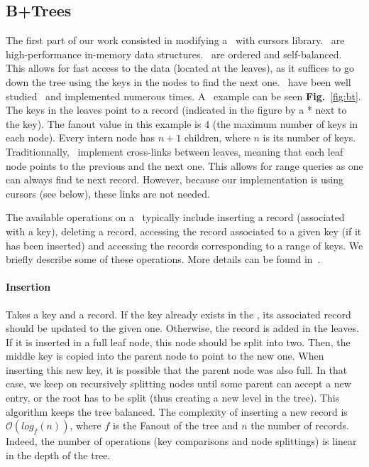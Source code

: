 
\subsection{B+Trees}
The first part of our work consisted in modifying a \btrees\ with cursors library.
\btrees\ are high-performance in-memory data structures. \btrees\ are ordered and self-balanced.
This allows for fast access to the data (located at the leaves), as it suffices to go down the tree using the keys in the nodes to find the next one.
\btrees\ have been well studied~\cite{dbms} and implemented numerous times. %
A \btree\ example can be seen \textbf{Fig.}~\ref{fig:bt}.
The keys in the leaves point to a record (indicated in the figure by a * next to the key).
The fanout value in this example is 4 (the maximum number of keys in each node).
Every intern node has $n+1$ children, where $n$ is its number of keys.
Traditionnally, \btrees\ implement cross-links between leaves, meaning that each leaf node points to the previous and the next one.
This allows for range queries as one can always find te next record.
However, because our implementation is using cursors (see below), these links are not needed.

The available operations on a \btree\ typically include inserting a record (associated with a key), deleting a record, accessing the record associated to a given key (if it has been inserted) and accessing the records corresponding to a range of keys.
We briefly describe some of these operations. More details can be found in~\cite{dbms}.
\paragraph{Insertion} Takes a key and a record.
If the key already exists in the \btree, its associated record should be updated to the given one. Otherwise, the record is added in the leaves.
If it is inserted in a full leaf node, this node should be split into two. Then, the middle key is copied into the parent node to point to the new one.
When inserting this new key, it is possible that the parent node was also full.
In that case, we keep on recursively splitting nodes until some parent can accept a new entry, or the root has to be split (thus creating a new level in the tree).
This algorithm keeps the tree balanced.
The complexity of inserting a new record is $\mathcal{O}(log_{f}(n))$, where $f$ is the Fanout of the tree and $n$ the number of records.
Indeed, the number of operations (key comparisons and node splittings) is linear in the depth of the tree.

